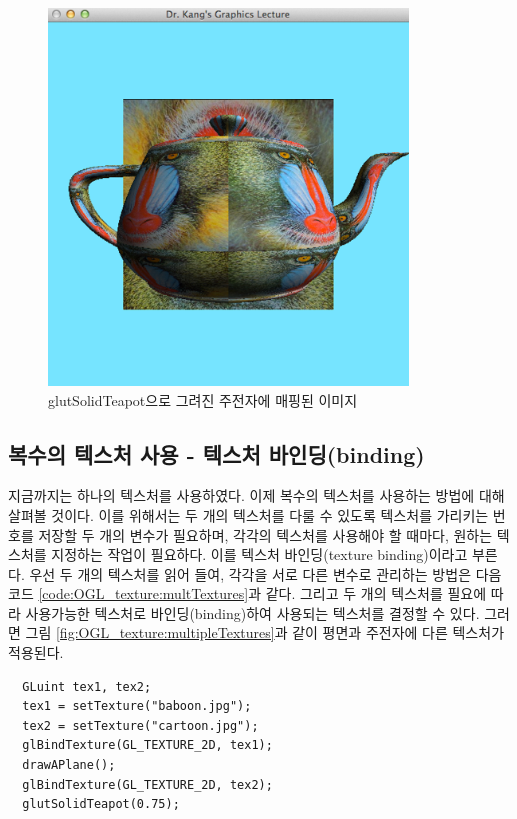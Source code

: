 \begin{figure}[h!]
  \centering
	\includegraphics[height=10cm]{OGL_texture/textureImageApplied.png}
    \caption{glutSolidTeapot으로 그려진 주전자에 매핑된 이미지}
    \label{fig:OGL_texture:textureImageApplied}
\end{figure}

\subsection{복수의 텍스처 사용 - 텍스처 바인딩(binding)}

지금까지는 하나의 텍스처를 사용하였다. 이제 복수의 텍스처를 사용하는 방법에 대해 살펴볼 것이다. 이를 위해서는 두 개의 텍스처를 다룰 수 있도록 텍스처를 가리키는 번호를 저장할 두 개의 변수가 필요하며, 각각의 텍스처를 사용해야 할 때마다, 원하는 텍스처를 지정하는 작업이 필요하다.
이를 텍스처 바인딩(texture binding)이라고 부른다.
우선 두 개의 텍스처를 읽어 들여, 각각을 서로 다른 변수로 관리하는 방법은 다음 코드 \ref{code:OGL_texture:multTextures}과 같다.
그리고 두 개의 텍스처를 필요에 따라 사용가능한 텍스처로 바인딩(binding)하여 사용되는 텍스처를 결정할 수 있다.
그러면 그림 \ref{fig:OGL_texture:multipleTextures}과 같이 평면과 주전자에 다른 텍스처가 적용된다.

\begin{algorithmbis}\label{code:OGL_texture:multTextures}
\lstset{language=C++} 
\begin{lstlisting}
  GLuint tex1, tex2;
  tex1 = setTexture("baboon.jpg");
  tex2 = setTexture("cartoon.jpg");
  glBindTexture(GL_TEXTURE_2D, tex1);
  drawAPlane();
  glBindTexture(GL_TEXTURE_2D, tex2);
  glutSolidTeapot(0.75);
\end{lstlisting}
\end{algorithmbis}

